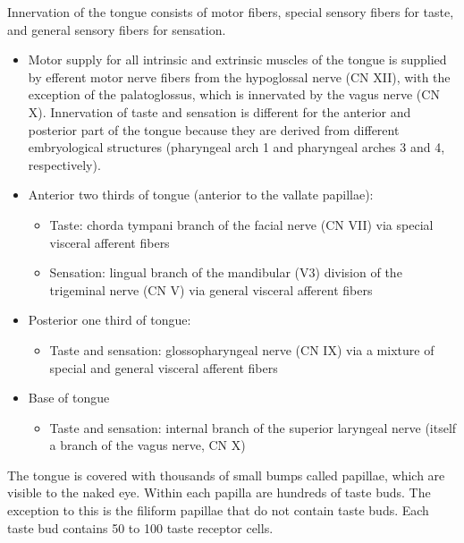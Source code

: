 Innervation of the tongue consists of motor fibers, special sensory fibers for taste, and general sensory fibers for sensation.

\begin{itemize}
\item
  Motor supply for all intrinsic and extrinsic muscles of the tongue is supplied by efferent motor nerve fibers from the hypoglossal nerve (CN XII), with the exception of the palatoglossus, which is innervated by the vagus nerve (CN X).
  Innervation of taste and sensation is different for the anterior and posterior part of the tongue because they are derived from different embryological structures (pharyngeal arch 1 and pharyngeal arches 3 and 4, respectively).
\item
  Anterior two thirds of tongue (anterior to the vallate papillae):

  \begin{itemize}
  \tightlist
  \item
    Taste: chorda tympani branch of the facial nerve (CN VII) via special visceral afferent fibers
  \item
    Sensation: lingual branch of the mandibular (V3) division of the trigeminal nerve (CN V) via general visceral afferent fibers
  \end{itemize}
\item
  Posterior one third of tongue:

  \begin{itemize}
  \tightlist
  \item
    Taste and sensation: glossopharyngeal nerve (CN IX) via a mixture of special and general visceral afferent fibers
  \end{itemize}
\item
  Base of tongue

  \begin{itemize}
  \tightlist
  \item
    Taste and sensation: internal branch of the superior laryngeal nerve (itself a branch of the vagus nerve, CN X)
  \end{itemize}
\end{itemize}

The tongue is covered with thousands of small bumps called papillae, which are visible to the naked eye. Within each papilla are hundreds of taste buds. The exception to this is the filiform papillae that do not contain taste buds. Each taste bud contains 50 to 100 taste receptor cells.



